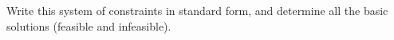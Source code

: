 Write this system of constraints in standard form, and determine all the basic solutions (feasible and infeasible).

\begin{solution}
  \ \\
  \pagebreak
  \ \\
  \pagebreak
  \ \\
  \vfill
\end{solution}